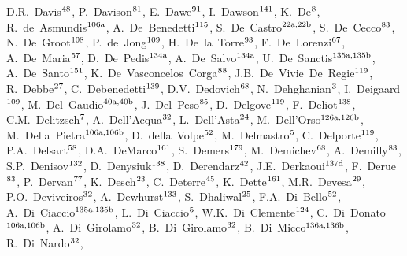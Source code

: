 \begin{flushleft}
D.R.~Davis$^\textrm{\scriptsize 48}$,
P.~Davison$^\textrm{\scriptsize 81}$,
E.~Dawe$^\textrm{\scriptsize 91}$,
I.~Dawson$^\textrm{\scriptsize 141}$,
K.~De$^\textrm{\scriptsize 8}$,
R.~de~Asmundis$^\textrm{\scriptsize 106a}$,
A.~De~Benedetti$^\textrm{\scriptsize 115}$,
S.~De~Castro$^\textrm{\scriptsize 22a,22b}$,
S.~De~Cecco$^\textrm{\scriptsize 83}$,
N.~De~Groot$^\textrm{\scriptsize 108}$,
P.~de~Jong$^\textrm{\scriptsize 109}$,
H.~De~la~Torre$^\textrm{\scriptsize 93}$,
F.~De~Lorenzi$^\textrm{\scriptsize 67}$,
A.~De~Maria$^\textrm{\scriptsize 57}$,
D.~De~Pedis$^\textrm{\scriptsize 134a}$,
A.~De~Salvo$^\textrm{\scriptsize 134a}$,
U.~De~Sanctis$^\textrm{\scriptsize 135a,135b}$,
A.~De~Santo$^\textrm{\scriptsize 151}$,
K.~De~Vasconcelos~Corga$^\textrm{\scriptsize 88}$,
J.B.~De~Vivie~De~Regie$^\textrm{\scriptsize 119}$,
R.~Debbe$^\textrm{\scriptsize 27}$,
C.~Debenedetti$^\textrm{\scriptsize 139}$,
D.V.~Dedovich$^\textrm{\scriptsize 68}$,
N.~Dehghanian$^\textrm{\scriptsize 3}$,
I.~Deigaard$^\textrm{\scriptsize 109}$,
M.~Del~Gaudio$^\textrm{\scriptsize 40a,40b}$,
J.~Del~Peso$^\textrm{\scriptsize 85}$,
D.~Delgove$^\textrm{\scriptsize 119}$,
F.~Deliot$^\textrm{\scriptsize 138}$,
C.M.~Delitzsch$^\textrm{\scriptsize 7}$,
A.~Dell'Acqua$^\textrm{\scriptsize 32}$,
L.~Dell'Asta$^\textrm{\scriptsize 24}$,
M.~Dell'Orso$^\textrm{\scriptsize 126a,126b}$,
M.~Della~Pietra$^\textrm{\scriptsize 106a,106b}$,
D.~della~Volpe$^\textrm{\scriptsize 52}$,
M.~Delmastro$^\textrm{\scriptsize 5}$,
C.~Delporte$^\textrm{\scriptsize 119}$,
P.A.~Delsart$^\textrm{\scriptsize 58}$,
D.A.~DeMarco$^\textrm{\scriptsize 161}$,
S.~Demers$^\textrm{\scriptsize 179}$,
M.~Demichev$^\textrm{\scriptsize 68}$,
A.~Demilly$^\textrm{\scriptsize 83}$,
S.P.~Denisov$^\textrm{\scriptsize 132}$,
D.~Denysiuk$^\textrm{\scriptsize 138}$,
D.~Derendarz$^\textrm{\scriptsize 42}$,
J.E.~Derkaoui$^\textrm{\scriptsize 137d}$,
F.~Derue$^\textrm{\scriptsize 83}$,
P.~Dervan$^\textrm{\scriptsize 77}$,
K.~Desch$^\textrm{\scriptsize 23}$,
C.~Deterre$^\textrm{\scriptsize 45}$,
K.~Dette$^\textrm{\scriptsize 161}$,
M.R.~Devesa$^\textrm{\scriptsize 29}$,
P.O.~Deviveiros$^\textrm{\scriptsize 32}$,
A.~Dewhurst$^\textrm{\scriptsize 133}$,
S.~Dhaliwal$^\textrm{\scriptsize 25}$,
F.A.~Di~Bello$^\textrm{\scriptsize 52}$,
A.~Di~Ciaccio$^\textrm{\scriptsize 135a,135b}$,
L.~Di~Ciaccio$^\textrm{\scriptsize 5}$,
W.K.~Di~Clemente$^\textrm{\scriptsize 124}$,
C.~Di~Donato$^\textrm{\scriptsize 106a,106b}$,
A.~Di~Girolamo$^\textrm{\scriptsize 32}$,
B.~Di~Girolamo$^\textrm{\scriptsize 32}$,
B.~Di~Micco$^\textrm{\scriptsize 136a,136b}$,
R.~Di~Nardo$^\textrm{\scriptsize 32}$,

\end{flushleft}
